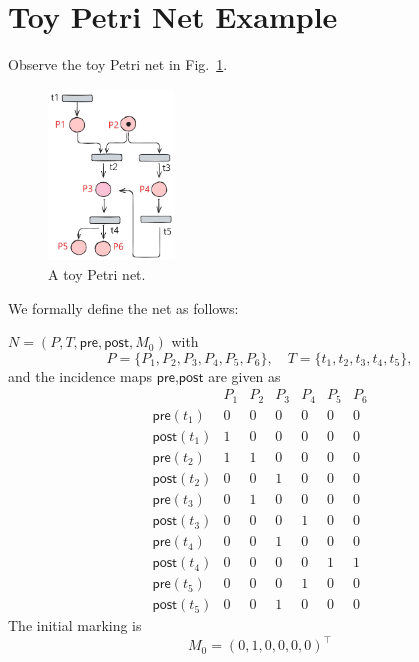 

\section{Toy Petri Net Example}
\label{appendix:toyPN}

Observe the toy Petri net in Fig.~\ref{fig:toyPN}.

\begin{figure}[H]
	\centering
	\includegraphics[width=0.3\textwidth]{plots/toy_PN_example.pdf}
	\caption{A toy Petri net.}
	\label{fig:toyPN}
\end{figure}



We formally define the net as follows:

 \(N=(P,T,\mathsf{pre},\mathsf{post},M_0)\) with
\[
P=\{P_1,P_2,P_3,P_4,P_5,P_6\},\quad
T=\{t_1,t_2,t_3,t_4,t_5\},
\]
and the incidence maps $\mathsf{pre}$,$\mathsf{post}$ are given as
\[
\begin{array}{c|cccccc}
	& P_1 & P_2 & P_3 & P_4 & P_5 & P_6 \\ \hline
	\mathsf{pre}(t_1)  & 0 & 0 & 0 & 0 & 0 & 0 \\
	\mathsf{post}(t_1) & 1 & 0 & 0 & 0 & 0 & 0 \\ \hline
	\mathsf{pre}(t_2)  & 1 & 1 & 0 & 0 & 0 & 0 \\
	\mathsf{post}(t_2) & 0 & 0 & 1 & 0 & 0 & 0 \\ \hline
	\mathsf{pre}(t_3)  & 0 & 1 & 0 & 0 & 0 & 0 \\
	\mathsf{post}(t_3) & 0 & 0 & 0 & 1 & 0 & 0 \\ \hline
	\mathsf{pre}(t_4)  & 0 & 0 & 1 & 0 & 0 & 0 \\
	\mathsf{post}(t_4) & 0 & 0 & 0 & 0 & 1 & 1 \\ \hline
	\mathsf{pre}(t_5)  & 0 & 0 & 0 & 1 & 0 & 0 \\
	\mathsf{post}(t_5) & 0 & 0 & 1 & 0 & 0 & 0
\end{array}
\]
The initial marking is
\[
M_0 = (0,1,0,0,0,0)^\top 
\]

